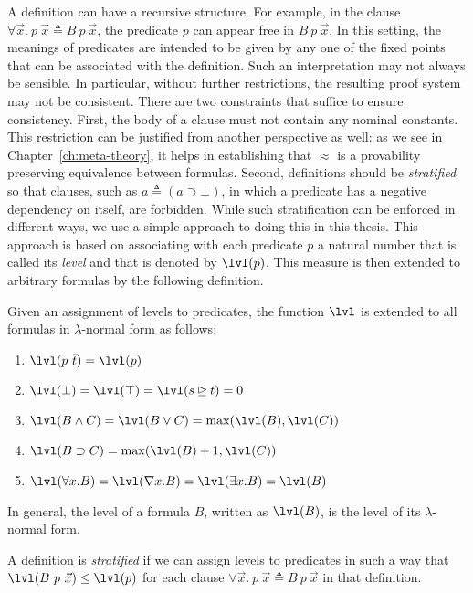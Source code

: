A definition can have a recursive structure. For example, in the clause
$\forall \vec{x}.~p\ \vec{x} \triangleq B\ p\ \vec{x}$, the predicate
$p$ can appear free in $B\ p\ \vec{x}$.  In this setting, the meanings
of predicates are intended to be given by any one of the fixed points
that can be associated with the definition.  Such an interpretation may
not always be sensible. In particular, without further restrictions,
the resulting proof system may not be consistent.  There are two
constraints that suffice to ensure consistency. First, the body of a
clause must not contain any nominal constants. This restriction
can be justified from another perspective as well: as we see in
Chapter~\ref{ch:meta-theory}, it helps in establishing that $\approx$
is a provability preserving equivalence between formulas. Second, definitions
should be {\em stratified} so that clauses, such as $a\triangleq
(a\supset \bot)$, in which a predicate has a negative dependency on
itself, are forbidden.  While such stratification can be enforced in
different ways, we use a simple approach to doing this in this
thesis. This approach is based on associating with each predicate $p$
a natural number that is called its {\em level} and that is denoted
by $\lvl(p)$.  This measure is then extended to arbitrary formulas by
the following definition.
\begin{definition}
Given an assignment of levels to predicates, the function $\lvl$ is
extended to all formulas in $\lambda$-normal form as follows:
\begin{enumerate}
\item $\lvl(p\ \bar{t}) = \lvl(p)$
\item $\lvl(\bot) = \lvl(\top) = \lvl(s\unrhd t) = 0$
\item $\lvl(B\land C) = \lvl(B\lor C) = \max(\lvl(B),\lvl(C))$
\item $\lvl(B\supset C) = \max(\lvl(B)+1,\lvl(C))$
\item $\lvl(\forall x.B) = \lvl(\nabla x.B) = \lvl(\exists x.B) =
\lvl(B)$
\end{enumerate}
In general, the level of a formula $B$, written as $\lvl(B)$, is the
level of its $\lambda$-normal form.
\end{definition}

A definition is {\em stratified} if we can assign levels to predicates
in such a way that $\lvl(B\ p\ \vec{x}) \leq \lvl(p)$ for each clause
$\forall \vec{x}.~p\ \vec{x} \triangleq B\ p\ \vec{x}$ in that
definition.

